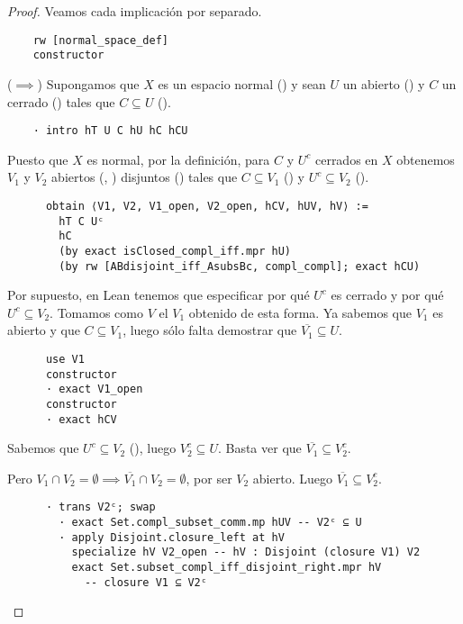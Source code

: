 \begin{proof}
  Veamos cada implicación por separado.

  \begin{lstlisting}
    rw [normal_space_def]
    constructor \end{lstlisting}

  ($\implies$) Supongamos que $X$ es un espacio normal () y sean $U$ un abierto () y $C$ un cerrado () tales que $C \subseteq U$ ().

  \begin{lstlisting}
    · intro hT U C hU hC hCU \end{lstlisting}
  
  Puesto que $X$ es normal, por la definición, para $C$ y $U^c$ cerrados en $X$ obtenemos $V_1$ y $V_2$ abiertos (, ) disjuntos () tales que $C \subseteq V_1$ () y $U^c \subseteq V_2$ ().

  \begin{lstlisting}
      obtain ⟨V1, V2, V1_open, V2_open, hCV, hUV, hV⟩ :=
        hT C Uᶜ
        hC
        (by exact isClosed_compl_iff.mpr hU)
        (by rw [ABdisjoint_iff_AsubsBc, compl_compl]; exact hCU) \end{lstlisting}

  Por supuesto, en Lean tenemos que especificar por qué $U^c$ es cerrado y por qué $U^c \subseteq V_2$.
  Tomamos como $V$ el $V_1$ obtenido de esta forma. Ya sabemos que $V_1$ es abierto y que $C\subseteq V_1$, luego sólo falta demostrar que $\overline{V_1} \subseteq U$.

  \begin{lstlisting}
      use V1
      constructor
      · exact V1_open
      constructor
      · exact hCV \end{lstlisting}

  Sabemos que $U^c \subseteq V_2$ (), luego $V_2^c \subseteq U$. Basta ver que $\overline{V_1} \subseteq V_2^c$.

  Pero $V_1 \cap V_2 = \emptyset \implies \overline{V_1} \cap V_2 = \emptyset$, por ser $V_2$ abierto. Luego $\overline{V_1} \subseteq V_2^c$.

  \begin{lstlisting}
      · trans V2ᶜ; swap
        · exact Set.compl_subset_comm.mp hUV -- V2ᶜ ⊆ U
        · apply Disjoint.closure_left at hV
          specialize hV V2_open -- hV : Disjoint (closure V1) V2
          exact Set.subset_compl_iff_disjoint_right.mpr hV
            -- closure V1 ⊆ V2ᶜ \end{lstlisting}


\end{proof}
